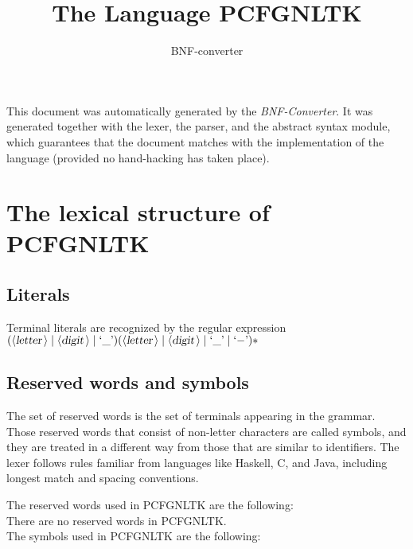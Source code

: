 \documentclass[a4paper,11pt]{article}
\author{BNF-converter}
\title{The Language PCFGNLTK}
\begin{document}
\maketitle

\newcommand{\emptyP}{\mbox{$\epsilon$}}
\newcommand{\terminal}[1]{\mbox{{\texttt {#1}}}}
\newcommand{\nonterminal}[1]{\mbox{$\langle \mbox{{\sl #1 }} \! \rangle$}}
\newcommand{\arrow}{\mbox{::=}}
\newcommand{\delimit}{\mbox{$|$}}
\newcommand{\reserved}[1]{\mbox{{\texttt {#1}}}}
\newcommand{\literal}[1]{\mbox{{\texttt {#1}}}}
\newcommand{\symb}[1]{\mbox{{\texttt {#1}}}}

This document was automatically generated by the {\em BNF-Converter}. It was generated together with the lexer, the parser, and the abstract syntax module, which guarantees that the document matches with the implementation of the language (provided no hand-hacking has taken place).

\section*{The lexical structure of PCFGNLTK}

\subsection*{Literals}



Terminal literals are recognized by the regular expression
\(({\nonterminal{letter}} \mid {\nonterminal{digit}} \mid \mbox{`\_'}) ({\nonterminal{letter}} \mid {\nonterminal{digit}} \mid \mbox{`\_'} \mid \mbox{`{$-$}'})*\)


\subsection*{Reserved words and symbols}
The set of reserved words is the set of terminals appearing in the grammar. Those reserved words that consist of non-letter characters are called symbols, and they are treated in a different way from those that are similar to identifiers. The lexer follows rules familiar from languages like Haskell, C, and Java, including longest match and spacing conventions.

The reserved words used in PCFGNLTK are the following: \\

There are no reserved words in PCFGNLTK.\\

The symbols used in PCFGNLTK are the following: \\
\end{document}

